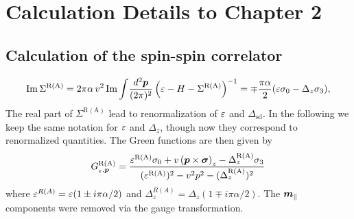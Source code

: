 \chapter{Calculation Details to Chapter 2}

\section{Calculation of the spin-spin correlator} 
\label{app:spinspin}

\begin{equation}
  \operatorname{Im} \Sigma^\text{R(A)} = 2\pi\alpha\, v^2 \operatorname{Im} \int\!\frac{d^2\boldsymbol{p}}{(2\pi)^2}\left(\varepsilon-H-\Sigma^\text{R(A)}\right)^{-1} = \mp \frac{\pi\alpha}{2} (\varepsilon\sigma_0 -\Delta_z\sigma_3),
\end{equation}
The real part of $\Sigma^{\mathrm{R(A)}}$ lead to renormalization of $\varepsilon$ and $\Delta_\textrm{sd}$. In the following we keep the same notation for $\varepsilon$ and $\Delta_z$, though now they correspond to renormalized quantities. The Green functions are then given by
\begin{equation}
      G_{_\varepsilon,\boldsymbol{p}}^{\mathrm{R(A)}} =
     \frac{
       \varepsilon^\mathrm{R(A)}\sigma_0 + v\left(\boldsymbol{p}\times\boldsymbol{\sigma}\right)_z - \Delta_z^\mathrm{R(A)} \sigma_3}
       {(\varepsilon^\text{R(A)})^2-v^2p^2-(\Delta_z^\text{R(A)})^2}
\end{equation}
where $\varepsilon^{R(A)}=\varepsilon(1\pm i\pi\alpha/2)$ and $\Delta_z^{R(A)}=\Delta_z(1\mp i\pi\alpha/2)$. The $\boldsymbol{m}_\parallel$ components were removed via the gauge transformation. 

